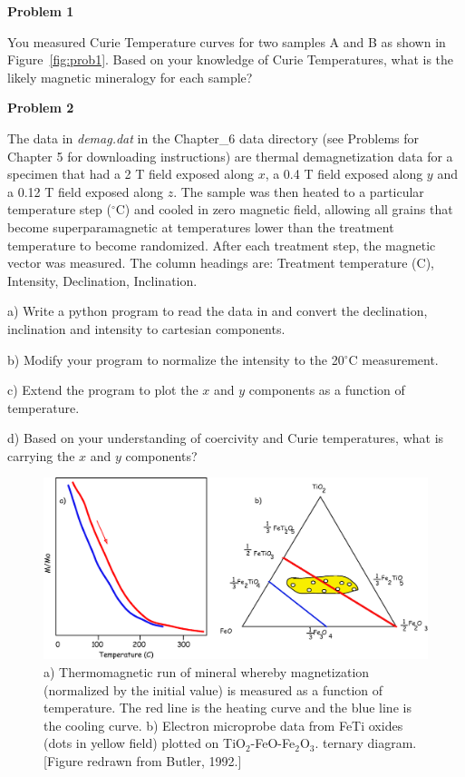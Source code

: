 {{\parindent 0pt \parskip 12pt 

{\bf Problem 1}

You measured Curie Temperature curves for two samples A and B as shown in Figure~\ref{fig:prob1}.  Based on your knowledge of Curie Temperatures,  what is the likely magnetic mineralogy for each sample?  



{\bf Problem 2}

The data in {\it demag.dat} in the Chapter\_6 data directory (see Problems for  Chapter 5 for downloading instructions) are thermal demagnetization data for a 
specimen that had a 2 T field exposed along $x$, a 0.4 T field
exposed along $y$ and a 0.12 T field exposed along $z$.    The sample was then heated to a particular temperature
step ($^{\circ}$C) and cooled in zero magnetic field, allowing all grains that become superparamagnetic at temperatures lower than the treatment temperature to become randomized.  After each treatment step, the magnetic vector was measured.    The column headings are:  Treatment temperature (C), Intensity, Declination, Inclination.  


a) Write a python program to read the data in and convert the declination, inclination and intensity to cartesian components.  

b) Modify your program to normalize the intensity to the 20$^{\circ}$C  measurement. 

c)  Extend the program to plot  the $x$ and $y$ components as a function of temperature.   

d)  Based on your understanding of coercivity and Curie temperatures, what is carrying the $x$ and $y$ components?  

\begin{figure}[h!tb]
\includegraphics[width=13 cm]{EPSfiles/microprobe.eps}
\caption{a) Thermomagnetic run of mineral whereby magnetization (normalized by the initial value) is measured as a function of temperature.  The red line is the heating curve and the blue line is the cooling curve.  b) Electron microprobe data  from FeTi oxides (dots in yellow field) plotted on TiO$_2$-FeO-Fe$_2$O$_3$.
ternary diagram. [Figure redrawn from Butler, 1992.]}
\label{fig:microprobe}
\end{figure}



}}
